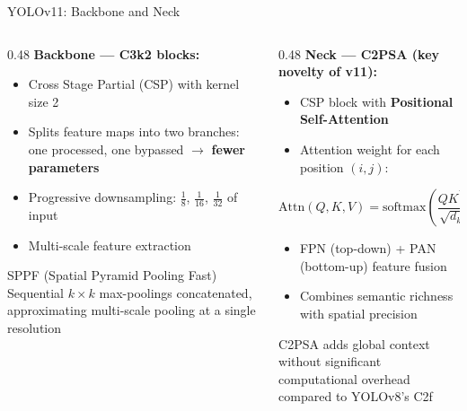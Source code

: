\documentclass[aspectratio=169]{beamer}
\begin{document}
\begin{frame}{YOLOv11: Backbone and Neck}
  \begin{columns}[T]
    \begin{column}{0.48\textwidth}
      \textbf{Backbone --- C3k2 blocks:}
      \begin{itemize}
        \item Cross Stage Partial (CSP) with kernel size 2
        \item Splits feature maps into two branches:\\
              one processed, one bypassed $\to$ \textbf{fewer parameters}
        \item Progressive downsampling: $\frac{1}{8}$, $\frac{1}{16}$, $\frac{1}{32}$ of input
        \item Multi-scale feature extraction
      \end{itemize}
      \vspace{0.3em}
      \begin{block}{SPPF (Spatial Pyramid Pooling Fast)}
        \small Sequential $k\!\times\!k$ max-poolings concatenated,
        approximating multi-scale pooling at a single resolution
      \end{block}
    \end{column}
    \begin{column}{0.48\textwidth}
      \textbf{Neck --- C2PSA (key novelty of v11):}
      \begin{itemize}
        \item CSP block with \textbf{Positional Self-Attention}
        \item Attention weight for each position $(i,j)$:
      \end{itemize}
      \vspace{-0.2em}
      \[
        \mathrm{Attn}(Q,K,V)=
        \mathrm{softmax}\!\left(\frac{QK^\top}{\sqrt{d_k}}\right)V
      \]
      \begin{itemize}
        \item FPN (top-down) + PAN (bottom-up) feature fusion
        \item Combines semantic richness with spatial precision
      \end{itemize}
      \begin{alertblock}{}
        \scriptsize C2PSA adds global context without significant
        computational overhead compared to YOLOv8's C2f
      \end{alertblock}
    \end{column}
  \end{columns}
\end{frame}
\end{document}
